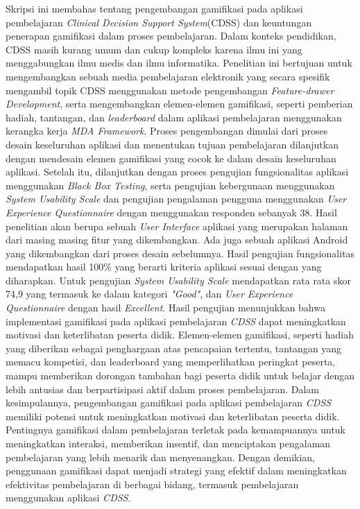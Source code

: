 Skripsi ini membahas tentang pengembangan gamifikasi pada aplikasi pembelajaran \textit{Clinical Decision Support System}(CDSS) dan keuntungan penerapan gamifikasi dalam proses pembelajaran. 
Dalam konteks pendidikan, CDSS masih kurang umum dan cukup kompleks karena ilmu ini yang menggabungkan ilmu medis dan ilmu informatika.
Penelitian ini bertujuan untuk mengembangkan sebuah media pembelajaran elektronik yang secara spesifik mengambil topik CDSS menggunakan metode pengembangan \textit{Feature-drawer Development},
serta mengembangkan elemen-elemen gamifikasi, seperti pemberian hadiah, tantangan, dan \textit{leaderboard} dalam aplikasi pembelajaran menggunakan kerangka kerja \textit{MDA Framework}. 
Proses pengembangan dimulai dari proses desain keseluruhan aplikasi dan menentukan tujuan pembelajaran dilanjutkan dengan mendesain elemen gamifikasi yang cocok ke dalam desain keseluruhan aplikasi.
Setelah itu, dilanjutkan dengan proses pengujian fungsionalitas aplikasi menggunakan \textit{Black Box Testing}, serta pengujian kebergunaan menggunakan \textit{System Usability Scale} dan pengujian pengalaman pengguna menggunakan \textit{User Experience Questionnaire} dengan menggunakan responden sebanyak 38.
Hasil penelitian akan berupa sebuah \textit{User Interface} aplikasi yang merupakan halaman dari masing masing fitur yang dikembangkan. Ada juga sebuah aplikasi Android yang dikembangkan dari proses desain sebelumnya.
Hasil pengujian fungsionalitas mendapatkan hasil 100\% yang berarti kriteria aplikasi sesuai dengan yang diharapkan. 
Untuk pengujian \textit{System Usability Scale} mendapatkan rata rata skor 74,9 yang termasuk ke dalam kategori \textit{"Good"}, dan \textit{User Experience Questionnaire} dengan hasil \textit{Excellent}.
Hasil pengujian menunjukkan bahwa implementasi gamifikasi pada aplikasi pembelajaran \textit{CDSS} dapat meningkatkan motivasi dan keterlibatan peserta didik. Elemen-elemen gamifikasi, seperti hadiah yang diberikan sebagai penghargaan atas pencapaian tertentu, tantangan yang memacu kompetisi, dan leaderboard yang memperlihatkan peringkat peserta, mampu memberikan dorongan tambahan bagi peserta didik untuk belajar dengan lebih antusias dan berpartisipasi aktif dalam proses pembelajaran.
Dalam kesimpulannya, pengembangan gamifikasi pada aplikasi pembelajaran \textit{CDSS} memiliki potensi untuk meningkatkan motivasi dan keterlibatan peserta didik. Pentingnya gamifikasi dalam pembelajaran terletak pada kemampuannya untuk meningkatkan interaksi, memberikan insentif, dan menciptakan pengalaman pembelajaran yang lebih menarik dan menyenangkan. Dengan demikian, penggunaan gamifikasi dapat menjadi strategi yang efektif dalam meningkatkan efektivitas pembelajaran di berbagai bidang, termasuk pembelajaran menggunakan aplikasi \textit{CDSS}.

